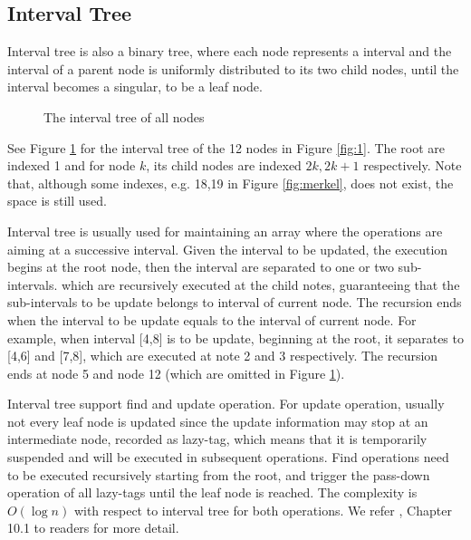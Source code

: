 \subsection{Interval Tree}
Interval tree is also a binary tree, where each node represents a interval and the interval of a parent node is uniformly distributed to its two child nodes, until the interval becomes a singular, to be a leaf node. 
\begin{figure}
	\centering
	
	\caption{The interval tree of all nodes}
				\label{fig:interval}
\end{figure}
See Figure \ref{fig:interval} for the interval tree of the 12 nodes in Figure \ref{fig:1}. The root are indexed 1 and for node $k$, its child nodes are indexed $2k,2k+1$ respectively. Note that, although some indexes, e.g. 18,19 in Figure \ref{fig:merkel}, does not exist, the space is still used. 

Interval tree is usually used for maintaining an array where the operations are aiming at a successive interval. Given the interval to be updated, the execution begins at the root node, then the interval are separated to one or two sub-intervals. which are recursively executed at the child notes, guaranteeing that the sub-intervals to be update belongs to interval of current node. The recursion ends when the interval to be update equals to the interval of current node. For example, when interval 
[4,8] is to be update, beginning at the root, it separates to [4,6] and [7,8], which are executed at note 2 and 3 respectively. The recursion ends at node 5 and node 12 (which are omitted in Figure \ref{fig:interval}).

Interval tree support find and update operation. For update operation, usually not every leaf node is updated since the update information may stop at an intermediate node, recorded as lazy-tag, which means that it is temporarily suspended and will be executed in subsequent operations. Find operations need to be executed recursively starting from the root, and trigger the pass-down operation of all lazy-tags until the leaf node is reached. The complexity is $O(\log n)$ with respect to interval tree for both operations. We refer \cite{mulmuley1994computational}, Chapter 10.1 to readers for more detail.


